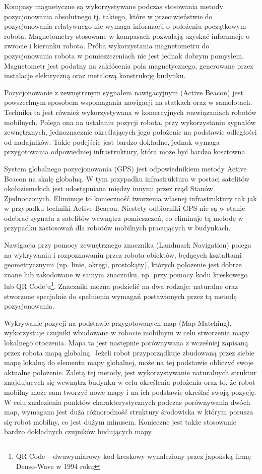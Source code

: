 Kompasy magnetyczne są wykorzystywane podczas stosowania metody pozycjonowania absolutnego tj. takiego, które w przeciwieństwie do pozycjonowania relatywnego nie wymaga informacji o położeniu początkowym robota. Magnetometry stosowane w kompasach pozwalają uzyskać informacje o zwrocie i kierunku robota. Próba wykorzystania magnetometru do pozycjonowania robota w pomieszczeniach nie jest jednak dobrym pomysłem. Magnetometr jest podatny na zakłócenia pola magnetycznego, generowane przez instalacje elektryczną oraz metalową konstrukcję budynku.

Pozycjonowanie z zewnętrznym sygnałem nawigacyjnym (Active Beacon) jest powszechnym sposobem wspomagania nawigacji na statkach oraz w samolotach. Technika ta jest również wykorzystywana w komercyjnych rozwiązaniach robotów mobilnych. Polega ona na ustalaniu pozycji robota, przy wykorzystaniu sygnałów zewnętrznych, jednoznacznie określających jego położenie na podstawie odległości od nadajników. Takie podejście jest bardzo dokładne, jednak wymaga przygotowania odpowiedniej infrastruktury, która może być bardzo kosztowna.

System globalnego pozycjonowania (GPS) jest odpowiednikiem metody Active Beacon na skalę globalną. W tym przypadku infrastruktura w postaci satelitów okołoziemskich jest udostępniana między innymi przez rząd Stanów Zjednoczonych. Eliminuje to konieczność tworzenia własnej infrastruktury tak jak w przypadku techniki Active Beacon. Niestety odbiorniki GPS nie są w stanie odebrać sygnału z satelitów wewnątrz pomieszczeń, co eliminuje tą metodę w przypadku zastosowań dla robotów mobilnych pracujących w budynkach.

Nawigacja przy pomocy zewnętrznego znacznika (Landmark Navigation) polega na wykrywaniu i rozpoznawaniu przez robota obiektów, będących kształtami geometrycznymi (np. linie, okręgi, prostokąty), których położenie jest dobrze znane lub zakodowane w samym znaczniku, np. przy pomocy kodu kreskowego lub QR Code'u\footnote{QR Code -- dwuwymiarowy kod kreskowy wynaleziony przez japońską firmę Denso-Wave w 1994 roku}. Znaczniki można podzielić na dwa rodzaje: naturalne oraz stworzone specjalnie do spełnienia wymagań postawionych przez tą metodę pozycjonowania.

Wykrywanie pozycji na podstawie przygotowanych map (Map Matching), wykorzystuje czujniki wbudowane w robocie mobilnym w celu stworzenia mapy lokalnego otoczenia. Mapa ta jest następnie porównywana z wcześniej zapisaną przez robota mapą globalną. Jeżeli robot przyporządkuje zbudowaną przez siebie mapę lokalną do elementu mapy globalnej, może na tej podstawie obliczyć swoje aktualne położenie. Zaletą tej metody, jest wykorzystywanie naturalnych struktur znajdujących się wewnątrz budynku w celu określenia położenia oraz to, że robot mobilny może sam tworzyć nowe mapy i na ich podstawie określać swoją pozycję. W celu znalezienia punktów charakterystycznych podczas porównywania dwóch map, wymagana jest duża różnorodność struktury środowiska w którym porusza się robot mobilny, co jest dużym minusem. Konieczne jest także stosowanie bardzo dokładnych czujników budujących mapy.

